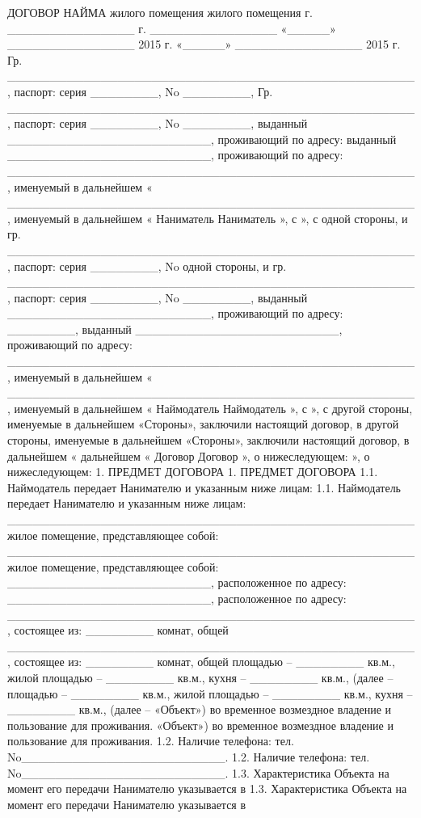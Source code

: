 ДОГОВОР НАЙМА
жилого помещения
жилого помещения
г. _______________
г. _______________
«_____» _______________ 2015 г.
«_____» _______________ 2015 г.
Гр. ________________________________________________, паспорт: серия ________,
No ________,
Гр. ________________________________________________, паспорт: серия ________,
No ________,
выданный ________________________, проживающий по адресу:
выданный ________________________, проживающий по адресу:
________________________________________________, именуемый в дальнейшем «
________________________________________________, именуемый в дальнейшем «
Наниматель
Наниматель
», с
», с
одной стороны, и гр. ________________________________________________, паспорт:
серия ________, No
одной стороны, и гр. ________________________________________________, паспорт:
серия ________, No
________, выданный ________________________, проживающий по адресу:
________, выданный ________________________, проживающий по адресу:
________________________________________________, именуемый в дальнейшем «
________________________________________________, именуемый в дальнейшем «
Наймодатель
Наймодатель
», с
», с
другой стороны, именуемые в дальнейшем «Стороны», заключили настоящий договор, в
другой стороны, именуемые в дальнейшем «Стороны», заключили настоящий договор, в
дальнейшем «
дальнейшем «
Договор
Договор
», о нижеследующем:
», о нижеследующем:
1. ПРЕДМЕТ ДОГОВОРА
1. ПРЕДМЕТ ДОГОВОРА
1.1. Наймодатель передает Нанимателю и указанным ниже лицам:
1.1. Наймодатель передает Нанимателю и указанным ниже лицам:
________________________________________________ жилое помещение, представляющее
собой:
________________________________________________ жилое помещение, представляющее
собой:
________________________, расположенное по адресу:
________________________, расположенное по адресу:
________________________________________________, состоящее из: ________ комнат,
общей
________________________________________________, состоящее из: ________ комнат,
общей
площадью – ________ кв.м., жилой площадью – ________ кв.м., кухня – ________
кв.м., (далее –
площадью – ________ кв.м., жилой площадью – ________ кв.м., кухня – ________
кв.м., (далее –
«Объект») во временное возмездное владение и пользование для проживания.
«Объект») во временное возмездное владение и пользование для проживания.
1.2. Наличие телефона: тел. No________________________.
1.2. Наличие телефона: тел. No________________________.
1.3. Характеристика Объекта на момент его передачи Нанимателю указывается в
1.3. Характеристика Объекта на момент его передачи Нанимателю указывается в
